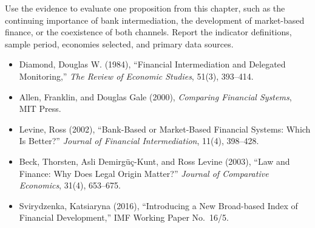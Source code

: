 Use the evidence to evaluate one proposition from this chapter, such as the continuing importance of bank intermediation, the development of market-based finance, or the coexistence of both channels. Report the indicator definitions, sample period, economies selected, and primary data sources.



\begin{itemize}

\item Diamond, Douglas W. (1984), ``Financial Intermediation and Delegated Monitoring,'' 
\emph{The Review of Economic Studies}, 51(3), 393--414.

\item Allen, Franklin, and Douglas Gale (2000), 
\emph{Comparing Financial Systems}, MIT Press.

\item Levine, Ross (2002), ``Bank-Based or Market-Based Financial Systems: Which Is Better?'' 
\emph{Journal of Financial Intermediation}, 11(4), 398--428.

\item Beck, Thorsten, Asli Demirg\"{u}\c{c}-Kunt, and Ross Levine (2003), 
``Law and Finance: Why Does Legal Origin Matter?'' 
\emph{Journal of Comparative Economics}, 31(4), 653--675.

\item Svirydzenka, Katsiaryna (2016), 
``Introducing a New Broad-based Index of Financial Development,'' 
IMF Working Paper No.~16/5.

\end{itemize}

